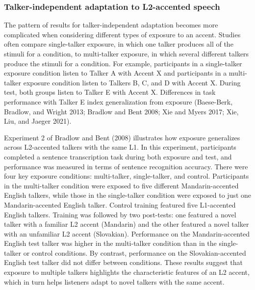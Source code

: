 \documentclass[
  preprint]{elsarticle}
\begin{document}
\hypertarget{talker-independent-adaptation-to-l2-accented-speech}{%
\subsubsection{Talker-independent adaptation to L2-accented speech}\label{talker-independent-adaptation-to-l2-accented-speech}}

The pattern of results for talker-independent adaptation becomes more complicated when considering different types of exposure to an accent.
Studies often compare single-talker exposure, in which one talker produces all of the stimuli for a condition, to multi-talker exposure, in which several different talkers produce the stimuli for a condition.
For example, participants in a single-talker exposure condition listen to Talker A with Accent X and participants in a multi-talker exposure condition listen to Talkers B, C, and D with Accent X.
During test, both groups listen to Talker E with Accent X.
Differences in task performance with Talker E index generalization from exposure (Baese-Berk, Bradlow, and Wright 2013; Bradlow and Bent 2008; Xie and Myers 2017; Xie, Liu, and Jaeger 2021).

Experiment 2 of Bradlow and Bent (2008) illustrates how exposure generalizes across L2-accented talkers with the same L1.
In this experiment, participants completed a sentence transcription task during both exposure and test, and performance was measured in terms of sentence recognition accuracy.
There were four key exposure conditions: multi-talker, single-talker, and control.
Participants in the multi-talker condition were exposed to five different Mandarin-accented English talkers, while those in the single-talker condition were exposed to just one Mandarin-accented English talker.
Control training featured five L1-accented English talkers.
Training was followed by two post-tests: one featured a novel talker with a familiar L2 accent (Mandarin) and the other featured a novel talker with an unfamiliar L2 accent (Slovakian).
Performance on the Mandarin-accented English test talker was higher in the multi-talker condition than in the single-talker or control conditions.
By contrast, performance on the Slovakian-accented English test talker did not differ between conditions.
These results suggest that exposure to multiple talkers highlights the characteristic features of an L2 accent, which in turn helps listeners adapt to novel talkers with the same accent.
\end{document}
